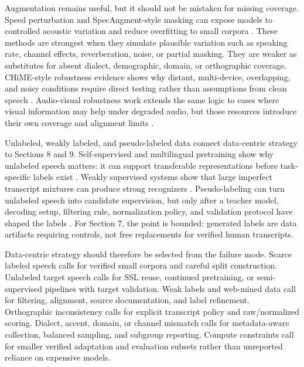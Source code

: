 \documentclass[pdflatex,sn-basic,iicol]{sn-jnl}
\theoremstyle{thmstyleone}
\theoremstyle{thmstyletwo}
\theoremstyle{thmstylethree}
\begin{document}
Augmentation remains useful, but it should not be mistaken for missing coverage. Speed perturbation and SpecAugment-style masking can expose models to controlled acoustic variation and reduce overfitting to small corpora \citep{ko15_interspeech,park19e_interspeech}. These methods are strongest when they simulate plausible variation such as speaking rate, channel effects, reverberation, noise, or partial masking. They are weaker as substitutes for absent dialect, demographic, domain, or orthographic coverage. CHiME-style robustness evidence shows why distant, multi-device, overlapping, and noisy conditions require direct testing rather than assumptions from clean speech \citep{cornell2023chime7}. Audio-visual robustness work extends the same logic to cases where visual information may help under degraded audio, but those resources introduce their own coverage and alignment limits \citep{anwar23_interspeech}.

Unlabeled, weakly labeled, and pseudo-labeled data connect data-centric strategy to Sections 8 and 9. Self-supervised and multilingual pretraining show why unlabeled speech matters: it can support transferable representations before task-specific labels exist \citep{baevski2020wav2vec2,babu22_interspeech}. Weakly supervised systems show that large imperfect transcript mixtures can produce strong recognizers \citep{pmlr-v202-radford23a}. Pseudo-labeling can turn unlabeled speech into candidate supervision, but only after a teacher model, decoding setup, filtering rule, normalization policy, and validation protocol have shaped the labels \citep{park20d_interspeech,khurana2020dust,bhogale24_interspeech}. For Section 7, the point is bounded: generated labels are data artifacts requiring controls, not free replacements for verified human transcripts.

Data-centric strategy should therefore be selected from the failure mode. Scarce labeled speech calls for verified small corpora and careful split construction. Unlabeled target speech calls for SSL reuse, continued pretraining, or semi-supervised pipelines with target validation. Weak labels and web-mined data call for filtering, alignment, source documentation, and label refinement. Orthographic inconsistency calls for explicit transcript policy and raw/normalized scoring. Dialect, accent, domain, or channel mismatch calls for metadata-aware collection, balanced sampling, and subgroup reporting. Compute constraints call for smaller verified adaptation and evaluation subsets rather than unreported reliance on expensive models.
\end{document}
